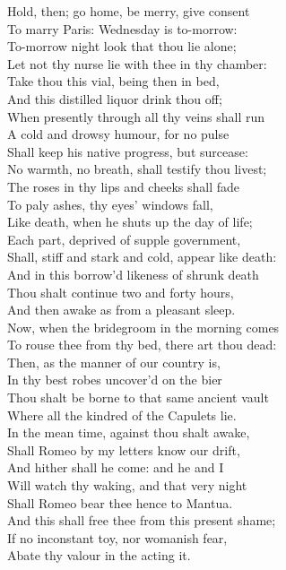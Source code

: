 \begin{speech}
Hold, then; go home, be merry, give consent \\

To marry Paris: Wednesday is to-morrow: \\
To-morrow night look that thou lie alone; \\
Let not thy nurse lie with thee in thy chamber: \\
Take thou this vial, being then in bed, \\
And this distilled liquor drink thou off; \\
When presently through all thy veins shall run \\
A cold and drowsy humour, for no pulse \\
Shall keep his native progress, but surcease: \\
No warmth, no breath, shall testify   thou livest; \\
The roses in thy lips and cheeks shall fade \\
To paly ashes, thy eyes' windows fall, \\
Like death, when he shuts up the day of life; \\
Each part, deprived of supple government, \\
Shall, stiff and stark and cold, appear like death: \\
And in this borrow'd likeness of shrunk death \\
Thou shalt continue two and forty hours, \\
And then awake as from a pleasant sleep. \\
Now, when the bridegroom in the morning comes \\
To rouse thee from thy bed, there art thou dead: \\
Then, as the manner of our country is, \\
In thy best robes uncover'd on the bier \\
Thou shalt be borne to that same ancient vault \\
Where all the kindred of the Capulets lie. \\
In the mean time, against thou shalt awake, \\
Shall Romeo by my letters know our drift, \\
And hither shall he come: and he and I \\
Will watch thy waking, and that very night \\
Shall Romeo bear thee hence to Mantua. \\
And this shall free thee from   this present shame; \\
If no inconstant toy, nor womanish fear, \\
Abate thy valour in the acting it. \\
\end{speech}

